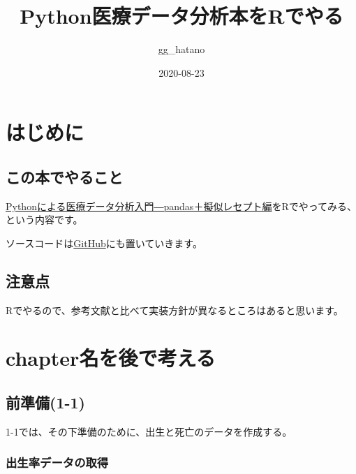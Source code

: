 \documentclass[
]{book}
\title{Python医療データ分析本をRでやる}
\author{gg\_hatano}
\date{2020-08-23}
\begin{document}
\maketitle

{
\setcounter{tocdepth}{1}
\tableofcontents
}
\hypertarget{ux306fux3058ux3081ux306b}{%
\chapter{はじめに}\label{ux306fux3058ux3081ux306b}}

\hypertarget{ux3053ux306eux672cux3067ux3084ux308bux3053ux3068}{%
\section{この本でやること}\label{ux3053ux306eux672cux3067ux3084ux308bux3053ux3068}}

\href{https://gihyo.jp/book/2020/978-4-297-11517-3}{Pythonによる医療データ分析入門―pandas＋擬似レセプト編}をRでやってみる、という内容です。

ソースコードは\href{https://github.com/gghatano/python_synthetic_medical_data}{GitHub}にも置いていきます。

\hypertarget{ux6ce8ux610fux70b9}{%
\section{注意点}\label{ux6ce8ux610fux70b9}}

Rでやるので、参考文献と比べて実装方針が異なるところはあると思います。

\hypertarget{chapterux540dux3092ux5f8cux3067ux8003ux3048ux308b}{%
\chapter{chapter名を後で考える}\label{chapterux540dux3092ux5f8cux3067ux8003ux3048ux308b}}

\hypertarget{ux524dux6e96ux50991-1}{%
\section{前準備(1-1)}\label{ux524dux6e96ux50991-1}}

1-1では、その下準備のために、出生と死亡のデータを作成する。

\hypertarget{ux51faux751fux7387ux30c7ux30fcux30bfux306eux53d6ux5f97}{%
\subsection{出生率データの取得}\label{ux51faux751fux7387ux30c7ux30fcux30bfux306eux53d6ux5f97}}
\end{document}

